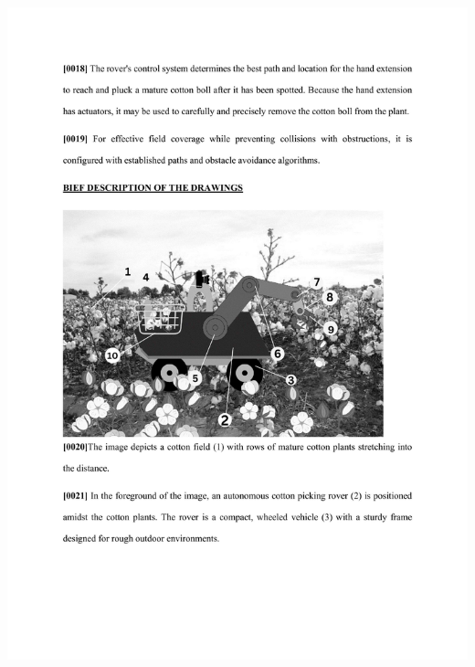 \documentclass[12pt,a4paper]{report}
\begin{document}
\includegraphics[scale =0.7]{images/patent/patent_doc/output-0003.jpg}
\newpage
\end{document}
